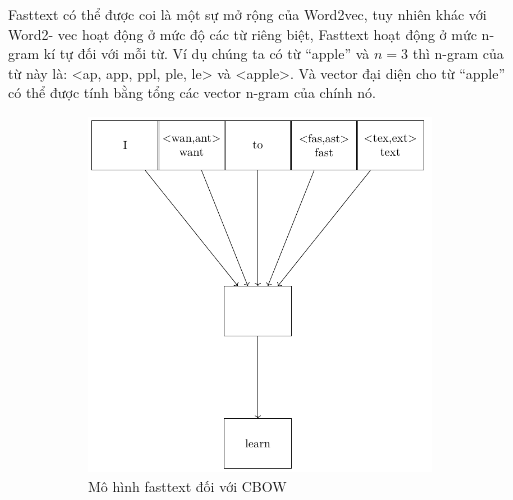 Fasttext có thể được coi là một sự mở rộng của Word2vec, tuy nhiên khác với Word2- vec hoạt động ở mức độ các từ riêng biệt, Fasttext hoạt động ở mức n-gram kí tự đối với mỗi từ. Ví dụ chúng ta có từ ``apple'' và $n = 3$ thì n-gram của từ này là: <ap, app, ppl, ple, le> và <apple>. Và vector đại diện cho từ ``apple'' có thể được tính bằng tổng các vector n-gram của chính nó.

\begin{figure}[htb]
    \centering
    \begin{subfigure}[t]{0.5\textwidth}
        \centering
        \includegraphics[width=\textwidth]{tikz_image/fasttext_cbow.pdf}
        \caption{Mô hình fasttext đối với CBOW \cite{webpage14}}
        \label{figure:fasttext-cbow}
    \end{subfigure}%
    \begin{subfigure}[t]{0.5\textwidth}
        \centering

\end{subfigure}
\end{figure}
